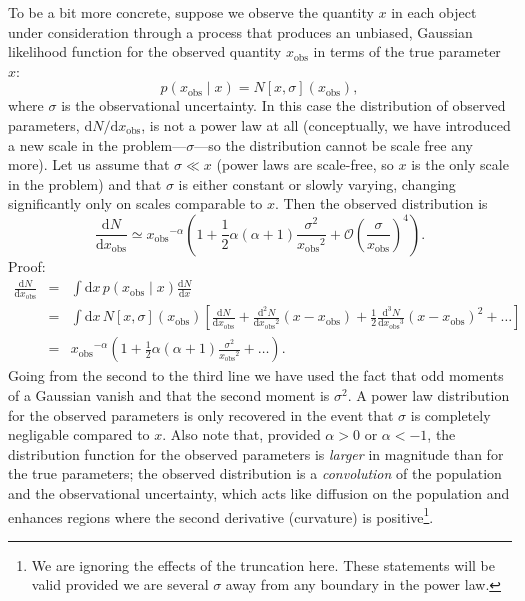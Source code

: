 \documentclass[modern]{aastex62}
\newcommand{\dd}{\ensuremath{\mathrm{d}}}
\newcommand{\diff}[2]{\ensuremath{\frac{\dd #1}{\dd #2}}}
\newcommand{\order}[1]{\ensuremath{\mathcal{O} \left(#1 \right)}}
\newcommand{\xobs}{\ensuremath{x_\mathrm{obs}}}
\begin{document}
To be a bit more concrete, suppose we observe the quantity $x$ in each object
under consideration through a process that produces an unbiased, Gaussian
likelihood function for the observed quantity $\xobs$ in terms of the true
parameter $x$:
%
\begin{equation}
  p\left( \xobs \mid x \right) = N\left[ x, \sigma \right]\left( \xobs \right),
\end{equation}
%
where $\sigma$ is the observational uncertainty.  In this case the distribution
of observed parameters, $\dd N / \dd \xobs$, is not a power law at all
(conceptually, we have introduced a new scale in the problem---$\sigma$---so the
distribution cannot be scale free any more).  Let us assume that $\sigma \ll x$
(power laws are scale-free, so $x$ is the only scale in the problem) and that
$\sigma$ is either constant or slowly varying, changing significantly only on
scales comparable to $x$.  Then the observed distribution is
%
\begin{equation}
  \diff{N}{\xobs} \simeq \xobs^{-\alpha}  \left( 1 + \frac{1}{2} \alpha \left( \alpha + 1 \right) \frac{\sigma^2}{\xobs^2} + \order{\frac{\sigma}{\xobs}}^4 \right).
\end{equation}
%
Proof:
%
\begin{eqnarray}
  \diff{N}{\xobs} & = & \int \dd x \, p\left( \xobs \mid x \right) \diff{N}{x} \\
  & = & \int \dd x \, N\left[ x, \sigma \right]\left( \xobs \right) \left[ \diff{N}{\xobs} + \frac{\dd^2 N}{\dd \xobs^2} \left( x - \xobs \right) + \frac{1}{2} \frac{\dd^3 N}{\dd \xobs^3} \left( x - \xobs\right)^2 + \ldots \right] \\
  & = & \xobs^{-\alpha}\left(1 + \frac{1}{2} \alpha \left( \alpha + 1 \right) \frac{\sigma^2}{\xobs^2} + \ldots \right).
\end{eqnarray}
%
Going from the second to the third line we have used the fact that odd moments
of a Gaussian vanish and that the second moment is $\sigma^2$.  A power law
distribution for the observed parameters is only recovered in the event that
$\sigma$ is completely negligable compared to $x$.  Also note that, provided
$\alpha > 0$ or $\alpha < -1$, the distribution function for the observed
parameters is \emph{larger} in magnitude than for the true parameters; the
observed distribution is a \emph{convolution} of the population and the
observational uncertainty, which acts like diffusion on the population and
enhances regions where the second derivative (curvature) is positive\footnote{We
are ignoring the effects of the truncation here.  These statements will be valid
provided we are several $\sigma$ away from any boundary in the power law.}.
\end{document}
